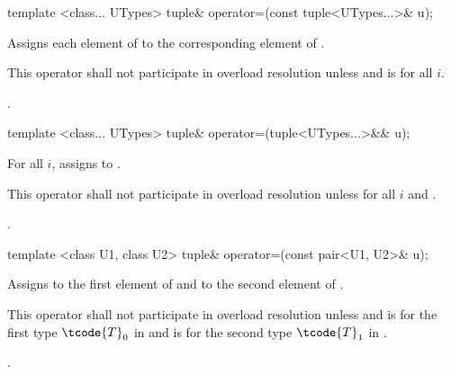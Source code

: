 %
\begin{itemdecl}
template <class... UTypes> tuple& operator=(const tuple<UTypes...>& u);
\end{itemdecl}

\begin{itemdescr}
\pnum
\effects Assigns each element of  to the corresponding element
of .

\pnum
\remarks This operator shall not participate in overload resolution unless
 and
 is  for all $i$.

\pnum
\returns {}.
\end{itemdescr}

%
\begin{itemdecl}
template <class... UTypes> tuple& operator=(tuple<UTypes...>&& u);
\end{itemdecl}

\begin{itemdescr}
\pnum
\effects For all $i$, assigns  to
.

\pnum
\remarks This operator shall not participate in overload resolution unless
 for all $i$ and
.

\pnum
\returns {}.
\end{itemdescr}

%
%
\begin{itemdecl}
template <class U1, class U2> tuple& operator=(const pair<U1, U2>& u);
\end{itemdecl}

\begin{itemdescr}
\pnum
\effects  Assigns  to the first element of 
and  to the second element of .

\pnum
\remarks This operator shall not participate in overload resolution unless
 and
 is  for the first type $\tcode{T}_0$ in
 and  is  for the
second type $\tcode{T}_1$ in .

\pnum
\returns {}.
\end{itemdescr}

